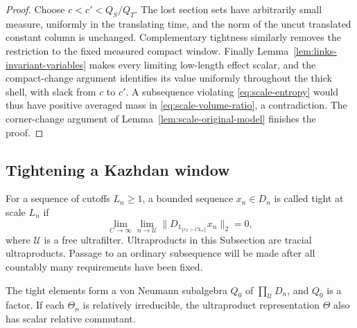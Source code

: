 \begin{proof}
Choose \(c<c'<Q_S/Q_T\).  The lost section sets have
arbitrarily small measure, uniformly in the translating
time, and the norm of the uncut translated constant column
is unchanged.  Complementary tightness similarly removes
the restriction to the fixed measured compact window.
Finally Lemma~\ref{lem:links-invariant-variables} makes every
limiting low-length effect scalar, and the compact-change
argument identifies its value uniformly throughout the
thick shell, with slack from \(c\) to \(c'\).  A subsequence
violating \eqref{eq:scale-entropy} would thus have positive
averaged mass in \eqref{eq:scale-volume-ratio}, a
contradiction.  The corner-change argument of
Lemma~\ref{lem:scale-original-model} finishes the proof.
\end{proof}

\subsection{Tightening a Kazhdan window}

For a sequence of cutoffs \(L_n\ge1\), a bounded sequence
\(x_n\in D_n\) is called tight at scale \(L_n\) if
\begin{equation}
 \lim_{C\to\infty}\lim_{n\to\mathcal U}
 \|D_{1_{\{r_T>CL_n\}}}x_n\|_2=0,
 \label{eq:scale-tight-sequence}
\end{equation}
where \(\mathcal U\) is a free ultrafilter.  Ultraproducts in
this Subsection are tracial ultraproducts.  Passage to an
ordinary subsequence will be made after all countably many
requirements have been fixed.

\begin{lemma}\label{lem:scale-tight-factor}
The tight elements form a von Neumann subalgebra \(Q_0\)
of \(\prod_{\mathcal U}D_n\), and \(Q_0\) is a factor.
If each \(\Theta_n\) is relatively irreducible, the
ultraproduct representation \(\Theta\) also has scalar
relative commutant.
\end{lemma}

